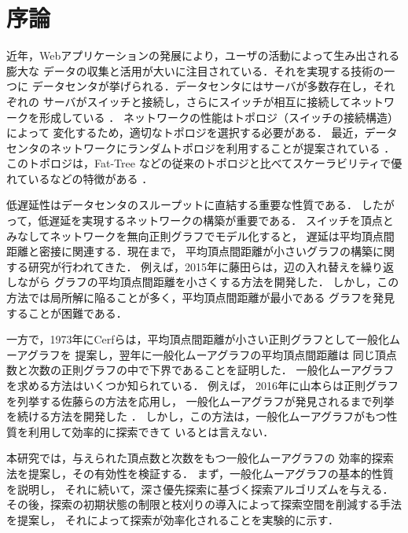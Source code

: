 
\chapter{序論}
近年，Webアプリケーションの発展により，ユーザの活動によって生み出される膨大な
データの収集と活用が大いに注目されている．それを実現する技術の一つに
データセンタが挙げられる．データセンタにはサーバが多数存在し，それぞれの
サーバがスイッチと接続し，さらにスイッチが相互に接続してネットワークを形成している
\cite{Greenberg2009,Al-Fares2008}．
ネットワークの性能はトポロジ（スイッチの接続構造）によって
変化するため，適切なトポロジを選択する必要がある．
最近，データセンタのネットワークにランダムトポロジを利用することが提案されている
\cite{Singla2011,Koibuchi2012}．このトポロジは，Fat-Tree\cite{Al-Fares2008}
などの従来のトポロジと比べてスケーラビリティで優れているなどの特徴がある
\cite{Singla2011}．

低遅延性はデータセンタのスループットに直結する重要な性質である．
したがって，低遅延を実現するネットワークの構築が重要である．
スイッチを頂点とみなしてネットワークを無向正則グラフでモデル化すると，
遅延は平均頂点間距離と密接に関連する．現在まで，
平均頂点間距離が小さいグラフの構築に関する研究が行われてきた．
例えば，2015年に藤田らは，辺の入れ替えを繰り返しながら
グラフの平均頂点間距離を小さくする方法を開発した\cite{Fujita2015}．
しかし，この方法では局所解に陥ることが多く，平均頂点間距離が最小である
グラフを発見することが困難である．

一方で，1973年にCerfらは，平均頂点間距離が小さい正則グラフとして一般化ムーアグラフを
提案し\cite{Cerf1973}，翌年に一般化ムーアグラフの平均頂点間距離は
同じ頂点数と次数の正則グラフの中で下界であることを証明した\cite{Cerf1974Lower}．
一般化ムーアグラフを求める方法はいくつか知られている．
例えば，
2016年に山本らは正則グラフを列挙する佐藤らの方法\cite{Sato2008}を応用し，
一般化ムーアグラフが発見されるまで列挙を続ける方法を開発した
\cite{Yamamoto2016}．
しかし，この方法は，一般化ムーアグラフがもつ性質を利用して効率的に探索できて
いるとは言えない．

本研究では，与えられた頂点数と次数をもつ一般化ムーアグラフの
効率的探索法を提案し，その有効性を検証する．
まず，一般化ムーアグラフの基本的性質を説明し，
それに続いて，深さ優先探索に基づく探索アルゴリズムを与える．
その後，探索の初期状態の制限と枝刈りの導入によって探索空間を削減する手法を提案し，
それによって探索が効率化されることを実験的に示す．
